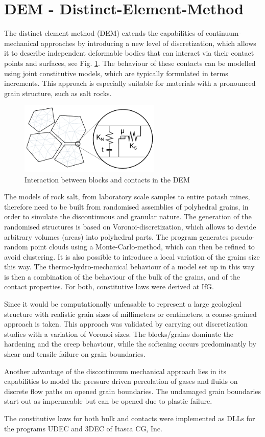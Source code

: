 \section{DEM - Distinct-Element-Method}


The distinct element method (DEM) extends the capabilities of continuum-mechanical approaches by introducing 
a new level of discretization, which allows it to describe independent deformable bodies that can interact 
via their contact points and surfaces, see Fig. \ref{fig:demskizze}. The behaviour of these contacts can be modelled using joint 
constitutive models, which are typically formulated in terms increments. This approach is especially suitable 
for materials with a pronounced grain structure, such as salt rocks. 

\begin{figure}[!ht]
\centering
\includegraphics[width=0.6\textwidth]{figures/skizze.png}
\caption{Interaction between blocks and contacts in the DEM}
\label{fig:demskizze}
\end{figure}

The models of rock salt, from laboratory scale samples to entire potash mines, therefore need to be built from 
randomised assemblies of polyhedral grains, in order to simulate the discontinuous and granular nature. The generation 
of the randomised structures is based on Voronoi-discretization, which allows to devide arbitrary volumes (areas) 
into polyhedral parts. The program generates pseudo-random point clouds using a Monte-Carlo-method, which can 
then be refined to avoid clustering. It is also possible to introduce a local variation of the grains size this way. 
The thermo-hydro-mechanical behaviour of a model set up in this way is then a combination of the behaviour of the 
bulk of the grains, and of the contact properties. For both, constitutive laws were derived at IfG. 

Since it would be computationally unfeasable to represent a large geological structure with realistic grain sizes 
of millimeters or centimeters, a coarse-grained approach is taken. This approach was validated by carrying out 
discretization studies with a variation of Voronoi sizes. The blocks/grains dominate the hardening and the creep 
behaviour, while the softening occurs predominantly by shear and tensile failure on grain boundaries. 

Another advantage of the discontinuum mechanical approach lies in its capabilities to model the pressure driven 
percolation of gases and fluids on discrete flow paths on opened grain boundaries. The undamaged grain boundaries 
start out as impermeable but can be opened due to plastic failure. 

The constitutive laws for both bulk and contacts were implemented as DLLs for the programs UDEC and 3DEC of Itasca CG, 
Inc.
